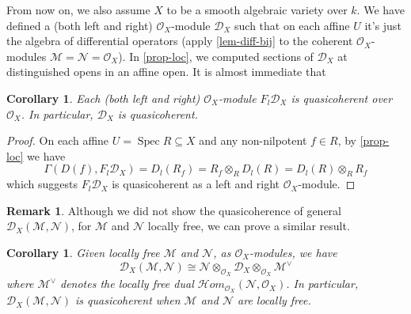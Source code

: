 \documentclass[11pt, a4paper]{article}
\newtheorem{corollary}[theorem]{Corollary}
\theoremstyle{definition}
\newtheorem{remark}[theorem]{Remark}
\newcommand{\Spec}[0]{\operatorname{Spec}}
\begin{document}
    From now on, we also assume $X$ to be a smooth algebraic variety over $k$. We have defined a (both left and right) $\mathcal O_X$-module $\mathcal D_X$ such that on each affine $U$ it's just the algebra of differential operators (apply \cref{lem-diff-bij} to the coherent $\mathcal O_X$-modules $\mathcal M=\mathcal N=\mathcal O_X$). In \cref{prop-loc}, we computed sections of $\mathcal D_X$ at distinguished opens in an affine open. It is almost immediate that
    \begin{corollary}\label{cor-qcoh-dx}
        Each (both left and right) $\mathcal O_X$-module $F_l\mathcal D_X$ is quasicoherent over $\mathcal O_X$. In particular, $\mathcal D_X$ is quasicoherent.
    \end{corollary}
    \begin{proof}
        On each affine $U=\Spec R\subseteq X$ and any non-nilpotent $f\in R$, by \cref{prop-loc} we have
        \[\Gamma(D(f), F_l\mathcal D_X)=D_l(R_f)=R_f\otimes_R D_l(R)=D_l(R)\otimes_R R_f\]
        which suggests $F_l\mathcal D_X$ is quasicoherent as a left and right $\mathcal O_X$-module.
    \end{proof}
    \begin{remark}
        Although we did not show the quasicoherence of general $\mathcal D_X(\mathcal M,\mathcal N)$, for $\mathcal M$ and $\mathcal N$ locally free, we can prove a similar result.
    \end{remark}
    \begin{corollary}\label{cor-twist-end}
        Given locally free $\mathcal M$ and $\mathcal N$, as $\mathcal O_X$-modules, we have
        \[\mathcal D_X(\mathcal M,\mathcal N)\cong \mathcal N\otimes_{\mathcal O_X}\mathcal D_X\otimes_{\mathcal O_X}\mathcal M^\vee\]
        where $\mathcal M^\vee$ denotes the locally free dual $\mathcal Hom_{\mathcal O_X}(\mathcal N,\mathcal O_X)$. In particular, $\mathcal D_X(\mathcal M,\mathcal N)$ is quasicoherent when $\mathcal M$ and $\mathcal N$ are locally free.
    \end{corollary}
\end{document}
